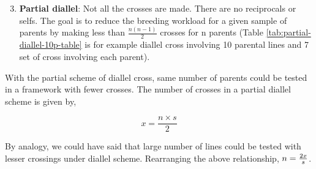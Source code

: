 \documentclass[11pt,dvipsnames,ignorenonframetext,aspectratio=169]{beamer}
\providecommand{\tightlist}{%
  \setlength{\itemsep}{0pt}\setlength{\parskip}{0pt}}
\begin{document}
\begin{frame}{}
\protect\hypertarget{section-9}{}
\begin{enumerate}
\setcounter{enumi}{2}
\tightlist
\item
  \textbf{Partial diallel}: Not all the crosses are made. There are no
  reciprocals or selfs. The goal is to reduce the breeding workload for
  a given sample of parents by making less than \(\frac{n(n-1)}{2}\)
  crosses for n parents (Table \ref{tab:partial-diallel-10p-table} is
  for example diallel cross involving 10 parental lines and 7 set of
  cross involving each parent).
\end{enumerate}

With the partial scheme of diallel cross, same number of parents could
be tested in a framework with fewer crosses. The number of crosses in a
partial diallel scheme is given by,

\[
x = \frac{n \times s}{2}
\]

By analogy, we could have said that large number of lines could be
tested with lesser crossings under diallel scheme. Rearranging the above
relationship, \(\large n = \frac{2x}{s}\).
\end{frame}
\end{document}
